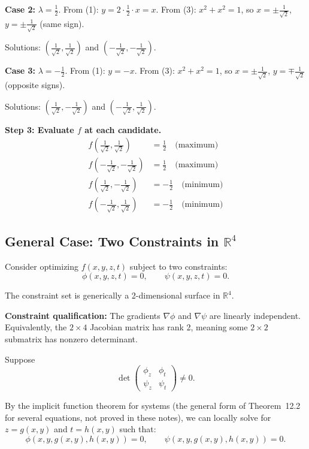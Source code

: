 \documentclass[11pt]{report}
\newcommand{\R}{\mathbb{R}}
\begin{document}
\textbf{Case 2:} $\lambda = \frac{1}{2}$. From (1): $y = 2 \cdot \frac{1}{2} \cdot x = x$. From (3): $x^2 + x^2 = 1$, so $x = \pm\frac{1}{\sqrt{2}}$, $y = \pm\frac{1}{\sqrt{2}}$ (same sign).

Solutions: $\left(\frac{1}{\sqrt{2}}, \frac{1}{\sqrt{2}}\right)$ and $\left(-\frac{1}{\sqrt{2}}, -\frac{1}{\sqrt{2}}\right)$.

\textbf{Case 3:} $\lambda = -\frac{1}{2}$. From (1): $y = -x$. From (3): $x^2 + x^2 = 1$, so $x = \pm\frac{1}{\sqrt{2}}$, $y = \mp\frac{1}{\sqrt{2}}$ (opposite signs).

Solutions: $\left(\frac{1}{\sqrt{2}}, -\frac{1}{\sqrt{2}}\right)$ and $\left(-\frac{1}{\sqrt{2}}, \frac{1}{\sqrt{2}}\right)$.

\textbf{Step 3: Evaluate $f$ at each candidate.}
\begin{align*}
f\left(\frac{1}{\sqrt{2}}, \frac{1}{\sqrt{2}}\right) &= \frac{1}{2} \quad \text{(maximum)} \\
f\left(-\frac{1}{\sqrt{2}}, -\frac{1}{\sqrt{2}}\right) &= \frac{1}{2} \quad \text{(maximum)} \\
f\left(\frac{1}{\sqrt{2}}, -\frac{1}{\sqrt{2}}\right) &= -\frac{1}{2} \quad \text{(minimum)} \\
f\left(-\frac{1}{\sqrt{2}}, \frac{1}{\sqrt{2}}\right) &= -\frac{1}{2} \quad \text{(minimum)}
\end{align*}

\subsection{General Case: Two Constraints in $\R^4$}

Consider optimizing $f(x, y, z, t)$ subject to two constraints:
\[
\phi(x, y, z, t) = 0, \qquad \psi(x, y, z, t) = 0.
\]

The constraint set is generically a 2-dimensional surface in $\R^4$.

\textbf{Constraint qualification:} The gradients $\nabla \phi$ and $\nabla \psi$ are linearly independent. Equivalently, the $2 \times 4$ Jacobian matrix has rank 2, meaning some $2 \times 2$ submatrix has nonzero determinant.

Suppose 
\[
\det \begin{pmatrix} \phi_z & \phi_t \\ \psi_z & \psi_t \end{pmatrix} \neq 0.
\]

By the implicit function theorem for systems (the general form of Theorem~12.2 for several equations, not proved in these notes), we can locally solve for $z = g(x, y)$ and $t = h(x, y)$ such that:
\[
\phi(x, y, g(x,y), h(x,y)) = 0, \qquad \psi(x, y, g(x,y), h(x,y)) = 0.
\]
\end{document}

